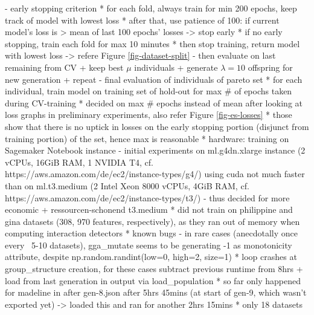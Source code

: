 \documentclass[twoside,11pt]{article}
\begin{document}
    - early stopping criterion
      * for each fold, always train for min 200 epochs, keep track of model with lowest loss
      * after that, use patience of 100: if current model's loss is > mean of last 100 epochs' losses -> stop early
      * if no early stopping, train each fold for max 10 minutes
      * then stop training, return model with lowest loss
    -> refere Figure \ref{fig-dataset-split}
    - then evaluate on last remaining from CV + keep best $\mu$ individuals + generate $\lambda=10$ offspring for new generation + repeat
    - final evaluation of individuals of pareto set
      * for each individual, train model on training set of hold-out for max \# of epochs taken during CV-training
      * decided on max \# epochs instead of mean after looking at loss graphs in preliminary experiments, also refer Figure \ref{fig-es-losses}
      * those show that there is no uptick in losses on the early stopping portion (disjunct from training portion) of the set, hence max is reasonable
  * hardware: training on Sagemaker Notebook instance
    - initial experiments on ml.g4dn.xlarge instance (2 vCPUs, 16GiB RAM, 1 NVIDIA T4, cf. https://aws.amazon.com/de/ec2/instance-types/g4/)
      using cuda not much faster than on ml.t3.medium (2 Intel Xeon 8000 vCPUs, 4GiB RAM, cf. https://aws.amazon.com/de/ec2/instance-types/t3/)
    - thus decided for more economic + ressourcen-schonend t3.medium
  * did not train on philippine and gina datasets (308, 970 features, respectively), as they ran out of memory when computing interaction detectors
  * known bugs
    - in rare cases (anecdotally once every ~5-10 datasets), gga\_mutate seems to be generating -1 as monotonicity attribute, despite np.random.randint(low=0, high=2, size=1)
      * loop crashes at group\_structure creation, for these cases subtract previous runtime from 8hrs + load from last generation in output via load\_population
      * so far only happened for madeline in after gen-8.json after 5hrs 45mins (at start of gen-9, which wasn't exported yet) -> loaded this and ran for another 2hrs 15mins
  * only 18 datasets
\end{document}
